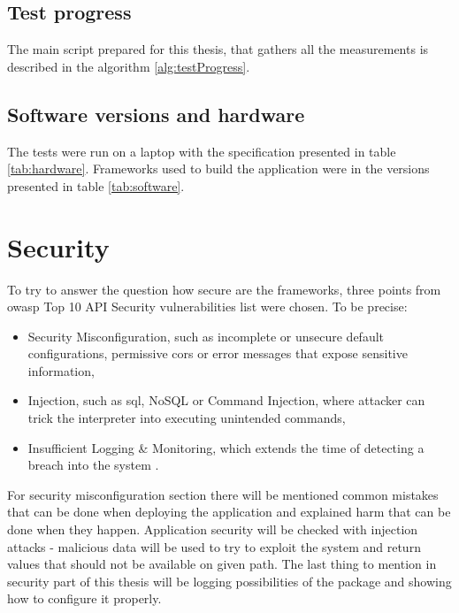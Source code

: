 \subsection{Test progress}

The main script prepared for this thesis, that gathers all the measurements is described in the algorithm \ref{alg:testProgress}.



\subsection{Software versions and hardware}

The tests were run on a laptop with the specification presented in table \ref{tab:hardware}.
Frameworks used to build the application were in the versions presented in table \ref{tab:software}.





\section{Security}
To try to answer the question how secure are the frameworks, three points from \acrshort{owasp} Top 10 API Security vulnerabilities list were chosen. To be precise:
\begin{itemize}
    \item Security Misconfiguration, such as incomplete or unsecure default configurations, permissive \acrshort{cors} or error messages that expose sensitive information,
    \item Injection, such as \acrshort{sql}, NoSQL or Command Injection, where attacker can trick the interpreter into executing unintended commands,
    \item Insufficient Logging \& Monitoring, which extends the time of detecting a breach into the system \cite{owaspTop10}.
\end{itemize}
For security misconfiguration section there will be mentioned common mistakes that can be done when deploying the application and explained harm that can be done when they happen.
Application security will be checked with injection attacks - malicious data will be used to try to exploit the system and return values that should not be available on given path.
The last thing to mention in security part of this thesis will be logging possibilities of the package and showing how to configure it properly.
